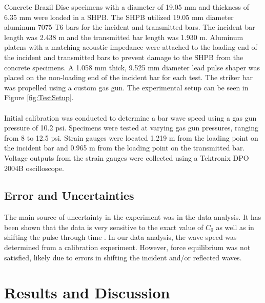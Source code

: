 \documentclass[12pt]{article}
\begin{document}
Concrete Brazil Disc specimens with a diameter of 19.05 mm and thickness of 6.35 mm were loaded in a SHPB. The SHPB utilized 19.05 mm diameter aluminum 7075-T6 bars for the incident and transmitted bars. The incident bar length was 2.438 m and the transmitted bar length was 1.930 m. Aluminum platens with a matching acoustic impedance were attached to the loading end of the incident and transmitted bars to prevent damage to the SHPB from the concrete specimens. A 1.058 mm thick, 9.525 mm diameter lead pulse shaper was placed on the non-loading end of the incident bar for each test. The striker bar was propelled using a custom gas gun. The experimental setup can be seen in Figure \ref{fig:TestSetup}.
\\ \\
Initial calibration was conducted to determine a bar wave speed using a gas gun pressure of 10.2 psi. Specimens were tested at varying gas gun pressures, ranging from 8 to 12.5 psi. Strain gauges were located 1.219 m from the loading point on the incident bar and 0.965 m from the loading point on the transmitted bar. Voltage outputs from the strain gauges were collected using a Tektronix DPO 2004B oscilloscope.   

\subsection{Error and Uncertainties} %

The main source of uncertainty in the experiment was in the data analysis. It has been shown that the data is very sensitive to the exact value of $C_0$ as well as in shifting the pulse through time \cite{Gama}. In our data analysis, the wave speed was determined from a calibration experiment. However, force equilibrium was not satisfied, likely due to errors in shifting the incident and/or reflected waves.

\section{Results and Discussion} %
\end{document}
